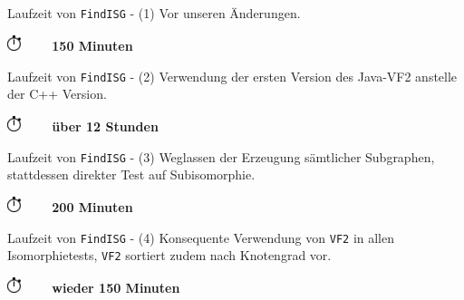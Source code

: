 \renewcommand{\mark}[1]{\node[circle,fill=#1] {};}
\newcommand{\emptycirc}{\node[circle,draw] {};}

\begin{frame}[<+->]{Laufzeit von \texttt{FindISG} - (1)}{}
  {\beamerblue Vor unseren Änderungen.\newline}
  \begin{figure}
    \centering
    
  \end{figure}
  \begin{center}
    \includegraphics[width=0.4cm]{stop-watch-icon.png} \bf ~~~ 150 Minuten
  \end{center}
\end{frame}

\begin{frame}[<+->]{Laufzeit von \texttt{FindISG} - (2)}{}
  {\beamerblue Verwendung der ersten Version des Java-VF2 anstelle der C++ Version.\newline}
  \begin{figure}
    \centering
    
  \end{figure}
  \begin{center}
    \includegraphics[width=0.4cm]{stop-watch-icon.png} \bf ~~~ über 12 Stunden
  \end{center}
\end{frame}

\begin{frame}[<+->]{Laufzeit von \texttt{FindISG} - (3)}{}
  {\beamerblue Weglassen der Erzeugung sämtlicher Subgraphen, stattdessen direkter Test
   auf Subisomorphie.}
  \begin{figure}
    \centering
    
  \end{figure}
  \begin{center}
    \includegraphics[width=0.4cm]{stop-watch-icon.png} \bf ~~~ 200 Minuten
  \end{center}
\end{frame}

\begin{frame}[<+->]{Laufzeit von \texttt{FindISG} - (4)}{}
  {\beamerblue Konsequente Verwendung von \texttt{VF2} in allen Isomorphietests,
   \texttt{VF2} sortiert zudem nach Knotengrad vor.}
  \begin{figure}
    \centering
    
  \end{figure}
  \begin{center}
    \includegraphics[width=0.4cm]{stop-watch-icon.png} \bf ~~~ wieder 150 Minuten
  \end{center}
\end{frame}

